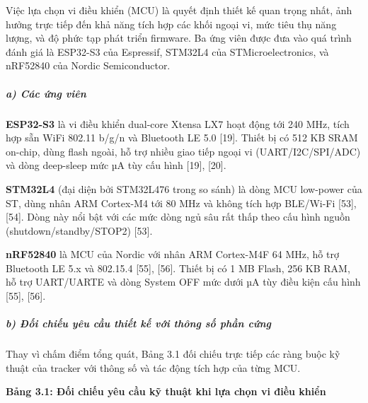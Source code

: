 \documentclass[13pt,a4paper]{extarticle}
\renewcommand{\\}{\thesislongtableorignewline\hline}%
\newcommand{\thesistabletitle}[1]{%
  \begin{center}\textbf{#1}\end{center}%
}
\begin{document}
Việc lựa chọn vi điều khiển (MCU) là quyết định thiết kế quan trọng
nhất, ảnh hưởng trực tiếp đến khả năng tích hợp các khối ngoại vi, mức
tiêu thụ năng lượng, và độ phức tạp phát triển firmware. Ba ứng viên
được đưa vào quá trình đánh giá là ESP32-S3 của Espressif, STM32L4 của
STMicroelectronics, và nRF52840 của Nordic Semiconductor.

\subparagraph{a) Các ứng viên}\label{a-cuxe1c-ux1ee9ng-viuxean}

\textbf{ESP32-S3} là vi điều khiển dual-core Xtensa LX7 hoạt động tới
240 MHz, tích hợp sẵn WiFi 802.11 b/g/n và Bluetooth LE 5.0 {[}19{]}.
Thiết bị có 512 KB SRAM on-chip, dùng flash ngoài, hỗ trợ nhiều giao
tiếp ngoại vi (UART/I2C/SPI/ADC) và dòng deep-sleep mức µA tùy cấu hình
{[}19{]}, {[}20{]}.

\textbf{STM32L4} (đại diện bởi STM32L476 trong so sánh) là dòng MCU
low-power của ST, dùng nhân ARM Cortex-M4 tới 80 MHz và không tích hợp
BLE/Wi-Fi {[}53{]}, {[}54{]}. Dòng này nổi bật với các mức dòng ngủ sâu
rất thấp theo cấu hình nguồn (shutdown/standby/STOP2) {[}53{]}.

\textbf{nRF52840} là MCU của Nordic với nhân ARM Cortex-M4F 64 MHz, hỗ
trợ Bluetooth LE 5.x và 802.15.4 {[}55{]}, {[}56{]}. Thiết bị có 1 MB
Flash, 256 KB RAM, hỗ trợ UART/UARTE và dòng System OFF mức dưới µA tùy
điều kiện cấu hình {[}55{]}, {[}56{]}.

\subparagraph{b) Đối chiếu yêu cầu thiết kế với thông số phần
cứng}\label{b-ux111ux1ed1i-chiux1ebfu-yuxeau-cux1ea7u-thiux1ebft-kux1ebf-vux1edbi-thuxf4ng-sux1ed1-phux1ea7n-cux1ee9ng}

Thay vì chấm điểm tổng quát, Bảng 3.1 đối chiếu trực tiếp các ràng buộc
kỹ thuật của tracker với thông số và tác động tích hợp của từng MCU.

\thesistabletitle{Bảng 3.1: Đối chiếu yêu cầu kỹ thuật khi lựa chọn vi điều khiển}
\end{document}
